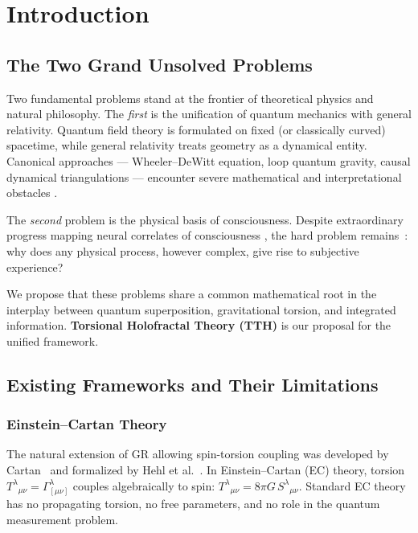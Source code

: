 \documentclass[12pt,a4paper]{article}
\newcommand{\tors}{T^{\lambda}{}_{\mu\nu}}
\newcommand{\spin}{S^{\lambda}{}_{\mu\nu}}
\numberwithin{equation}{section}
\begin{document}
\tableofcontents
\newpage

\section{Introduction}

\subsection{The Two Grand Unsolved Problems}

Two fundamental problems stand at the frontier of theoretical physics and natural philosophy.
The \emph{first} is the unification of quantum mechanics with general relativity.
Quantum field theory is formulated on fixed (or classically curved) spacetime, while
general relativity treats geometry as a dynamical entity.
Canonical approaches --- Wheeler--DeWitt equation, loop quantum gravity, causal dynamical
triangulations --- encounter severe mathematical and interpretational obstacles
\citep{Rovelli2004,Ashtekar2004,Kiefer2007}.

The \emph{second} problem is the physical basis of consciousness.
Despite extraordinary progress mapping neural correlates of consciousness
\citep{Koch2004,Dehaene2006}, the hard problem remains~\citep{Chalmers1995}:
why does any physical process, however complex, give rise to subjective experience?

We propose that these problems share a common mathematical root in the interplay
between quantum superposition, gravitational torsion, and integrated information.
\textbf{Torsional Holofractal Theory (TTH)} is our proposal for the unified framework.

\subsection{Existing Frameworks and Their Limitations}

\subsubsection{Einstein--Cartan Theory}
The natural extension of GR allowing spin-torsion coupling was developed by
Cartan~\citep{Cartan1922} and formalized by Hehl et al.~\citep{Hehl1976}.
In Einstein--Cartan (EC) theory, torsion $\tors = \Gamma^\lambda_{[\mu\nu]}$
couples algebraically to spin: $\tors = 8\pi G\,\spin$.
Standard EC theory has no propagating torsion, no free parameters, and no
role in the quantum measurement problem.
\end{document}
